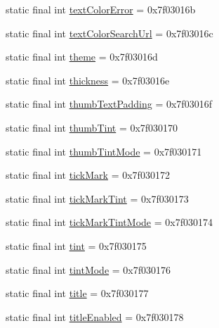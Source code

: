 \begin{DoxyCompactItemize}
\item 
static final int \mbox{\hyperlink{classandroid_1_1support_1_1design_1_1R_1_1attr_a7e86019393a4c821c9ad53322dab2114}{text\+Color\+Error}} = 0x7f03016b
\item 
static final int \mbox{\hyperlink{classandroid_1_1support_1_1design_1_1R_1_1attr_a3a48c2a0b795f2f217674c7fd606364e}{text\+Color\+Search\+Url}} = 0x7f03016c
\item 
static final int \mbox{\hyperlink{classandroid_1_1support_1_1design_1_1R_1_1attr_ae8f71f29f7bb0402c673e98fc94ee2fa}{theme}} = 0x7f03016d
\item 
static final int \mbox{\hyperlink{classandroid_1_1support_1_1design_1_1R_1_1attr_ad6da1795dd352215632c62593b260870}{thickness}} = 0x7f03016e
\item 
static final int \mbox{\hyperlink{classandroid_1_1support_1_1design_1_1R_1_1attr_a54e1b26aa0d6ec5ddefa2a11fbf42d9f}{thumb\+Text\+Padding}} = 0x7f03016f
\item 
static final int \mbox{\hyperlink{classandroid_1_1support_1_1design_1_1R_1_1attr_acfdbc1cd87de8b7d0a0f49a5752347e4}{thumb\+Tint}} = 0x7f030170
\item 
static final int \mbox{\hyperlink{classandroid_1_1support_1_1design_1_1R_1_1attr_ad99fa1d6324c942b77dce306aca37a80}{thumb\+Tint\+Mode}} = 0x7f030171
\item 
static final int \mbox{\hyperlink{classandroid_1_1support_1_1design_1_1R_1_1attr_a2c15ab478502b879ebe97ef2d4c408b9}{tick\+Mark}} = 0x7f030172
\item 
static final int \mbox{\hyperlink{classandroid_1_1support_1_1design_1_1R_1_1attr_a3059c83834df5f9a78fc7f4c496e5c1c}{tick\+Mark\+Tint}} = 0x7f030173
\item 
static final int \mbox{\hyperlink{classandroid_1_1support_1_1design_1_1R_1_1attr_a27b2ab5fb17a495f470dfb62f0b66d17}{tick\+Mark\+Tint\+Mode}} = 0x7f030174
\item 
static final int \mbox{\hyperlink{classandroid_1_1support_1_1design_1_1R_1_1attr_a9ed63bec4baad2b129a090cc47ec780b}{tint}} = 0x7f030175
\item 
static final int \mbox{\hyperlink{classandroid_1_1support_1_1design_1_1R_1_1attr_a7b7134730f47b14769a92094023c60f9}{tint\+Mode}} = 0x7f030176
\item 
static final int \mbox{\hyperlink{classandroid_1_1support_1_1design_1_1R_1_1attr_a457bf617809270ed8af320d41357f187}{title}} = 0x7f030177
\item 
static final int \mbox{\hyperlink{classandroid_1_1support_1_1design_1_1R_1_1attr_a4dde193ec35594da99607aa85ad0b723}{title\+Enabled}} = 0x7f030178

\end{DoxyCompactItemize}

